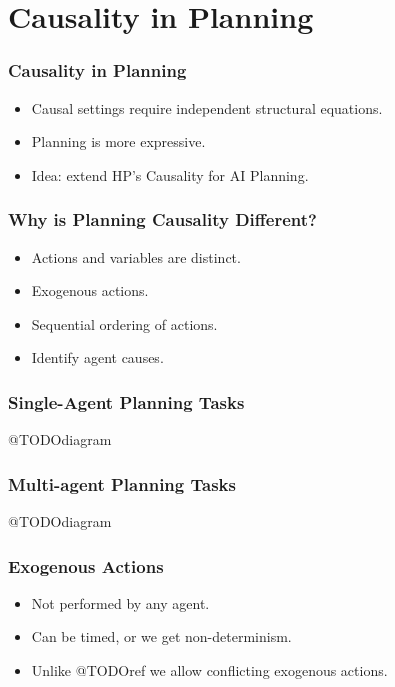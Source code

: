 \documentclass{beamer}
\theoremstyle{plain}
\theoremstyle{definition}
\begin{document}
\section{Causality in Planning}

\begin{frame}
\frametitle{Causality in Planning}
\begin{itemize}
\item Causal settings require independent structural equations.
\item Planning is more expressive.
\item Idea: extend HP's Causality for AI Planning.
\end{itemize}

\end{frame}



\begin{frame}
\frametitle{Why is Planning Causality Different?}
\begin{itemize}
\item Actions and variables are distinct.
\item Exogenous actions.
\item Sequential ordering of actions.
\item Identify agent causes.
\end{itemize}

\end{frame}


\begin{frame}
\frametitle{Single-Agent Planning Tasks}
@TODOdiagram

\end{frame}


\begin{frame}
\frametitle{Multi-agent Planning Tasks}
@TODOdiagram

\end{frame}


\begin{frame}
\frametitle{Exogenous Actions}
\begin{itemize}
\item Not performed by any agent.
\item Can be timed, or we get non-determinism.
\item Unlike @TODOref we allow conflicting exogenous actions.
\end{itemize}

\end{frame}
\end{document}
